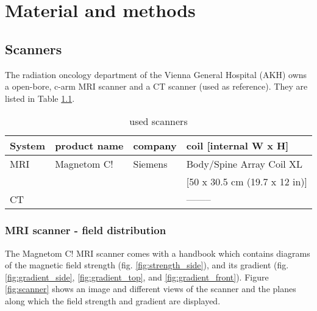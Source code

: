 

\chapter{Material and methods}


\section{Scanners}

The radiation oncology department of the Vienna General Hospital (AKH) owns a open-bore, c-arm MRI scanner and a CT scanner (used as reference).
They are listed in Table \ref{tab:scanners}.

\begin{table}[h]
\centering
\begin{tabular}{llll}
System	& product name	& company	& coil [internal W x H]		\\
\toprule
MRI	& Magnetom C!	& Siemens	& Body/Spine Array Coil XL	\\
	&		&		& [50 x 30.5 cm (19.7 x 12 in)]	\\
CT	&		&		& --------
\end{tabular}
\caption{used scanners}
\label{tab:scanners}
\end{table}

\subsection{MRI scanner - field distribution}

The Magnetom C! MRI scanner comes with a handbook which contains diagrams of the magnetic field strength (fig. \ref{fig:strength_side}), and its gradient (fig. \ref{fig:gradient_side}, \ref{fig:gradient_top}, and  \ref{fig:gradient_front}).
Figure \ref{fig:scanner} shows an image and different views of the scanner and the planes along which the field strength and gradient are displayed.

